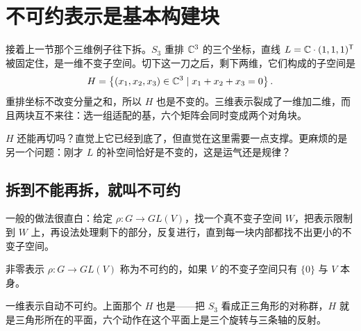 \section{不可约表示是基本构建块}
\label{sec:04-Discrete-Mathematics/09-Representation-Theory/02}

接着上一节那个三维例子往下拆。\(S_3\) 重排 \(\mathbb{C}^3\) 的三个坐标，直线 \(L=\mathbb{C}\cdot(1,1,1)^{\mathsf{T}}\) 被固定住，是一维不变子空间。切下这一刀之后，剩下两维，它们构成的子空间是
\[
H=\left\{(x_1,x_2,x_3)\in\mathbb{C}^3\mid x_1+x_2+x_3=0\right\}.
\]
重排坐标不改变分量之和，所以 \(H\) 也是不变的。三维表示裂成了一维加二维，而且两块互不来往：选一组适配的基，六个矩阵会同时变成两个对角块。

\(H\) 还能再切吗？直觉上它已经到底了，但直觉在这里需要一点支撑。更麻烦的是另一个问题：刚才 \(L\) 的补空间恰好是不变的，这是运气还是规律？

\subsection{拆到不能再拆，就叫不可约}

一般的做法很直白：给定 \(\rho:G\to GL(V)\)，找一个真不变子空间 \(W\)，把表示限制到 \(W\) 上，再设法处理剩下的部分，反复进行，直到每一块内部都找不出更小的不变子空间。

\begin{definition}
非零表示 \(\rho:G\to GL(V)\) 称为不可约的，如果 \(V\) 的不变子空间只有 \(\{0\}\) 与 \(V\) 本身。
\end{definition}

一维表示自动不可约。上面那个 \(H\) 也是——把 \(S_3\) 看成正三角形的对称群，\(H\) 就是三角形所在的平面，六个动作在这个平面上是三个旋转与三条轴的反射。

